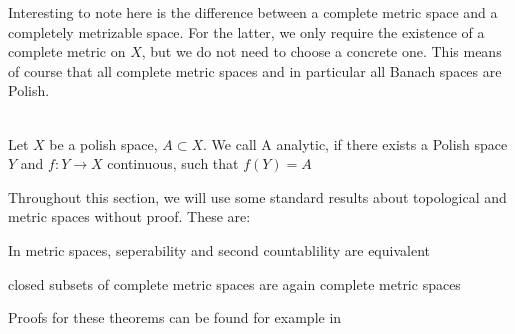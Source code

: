 \documentclass[10pt, a4paper, titlepage]{article}
\numberwithin{equation}{section}
\begin{document}
Interesting to note here is the difference between a complete metric space and a completely metrizable space.
For the latter, we only require the existence of a complete metric on $X$, but we do not need to choose a concrete one.
This means of course that all complete metric spaces and in particular all Banach spaces are Polish.\\
\\

\begin{definition}
	Let $X$ be a polish space, $A \subset X$. We call A analytic, if there exists a Polish space $Y$ and  $f:Y \to X$ continuous, such that  $f(Y) = A$

\end{definition}

Throughout this section, we will use some standard results about topological and metric spaces without proof. These are:
\begin{corollary}
	\label{second_countable}
	In metric spaces, seperability and second countablility are equivalent
\end{corollary}
\begin{corollary}
	\label{closed_cc}
	closed subsets of complete metric spaces are again complete metric spaces
\end{corollary}
Proofs for these theorems can be found for example in \cite{kaplansky2001}
\end{document}
